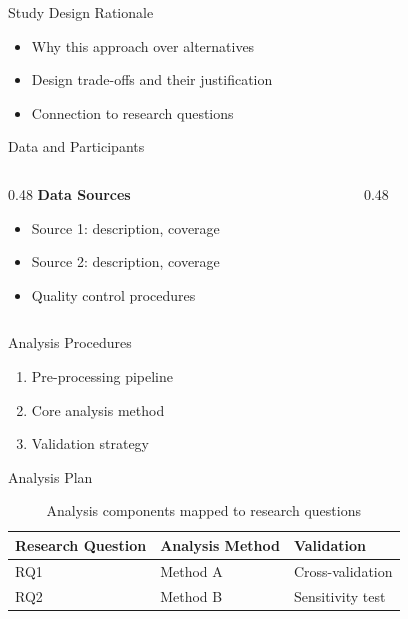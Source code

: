 \documentclass[aspectratio=169,11pt]{beamer}
\begin{document}
\begin{frame}{Study Design Rationale}
  \begin{itemize}
    \item Why this approach over alternatives
    \item Design trade-offs and their justification
    \item Connection to research questions
  \end{itemize}
\end{frame}

\begin{frame}{Data and Participants}
  \begin{columns}[T]
    \begin{column}{0.48\textwidth}
      \textbf{Data Sources}
      \begin{itemize}
        \item Source 1: description, coverage
        \item Source 2: description, coverage
        \item Quality control procedures
      \end{itemize}
    \end{column}
    \begin{column}{0.48\textwidth}
    \end{column}
  \end{columns}
\end{frame}

\begin{frame}{Analysis Procedures}
  \begin{enumerate}
    \item Pre-processing pipeline
    \item Core analysis method
    \item Validation strategy
  \end{enumerate}
\end{frame}

\begin{frame}{Analysis Plan}
  \begin{table}
    \caption{Analysis components mapped to research questions}
    \begin{tabular}{lll}
      \toprule
      Research Question & Analysis Method & Validation \\
      \midrule
      RQ1 & Method A & Cross-validation \\
      RQ2 & Method B & Sensitivity test \\
      \bottomrule
    \end{tabular}
  \end{table}
\end{frame}
\end{document}
